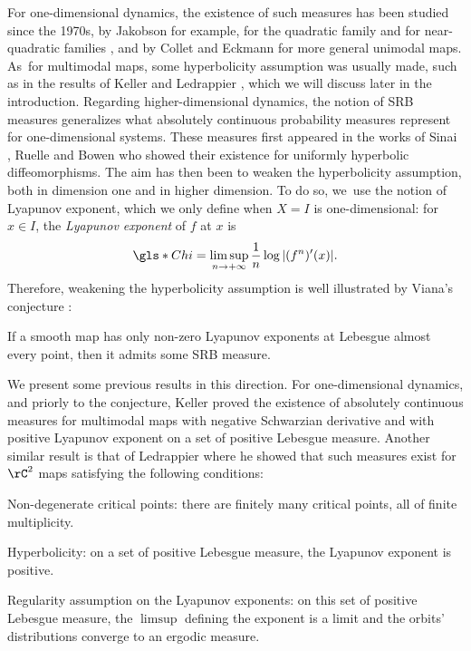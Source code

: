 For one-dimensional dynamics, the existence of such measures has been studied since the 1970s,
by Jakobson for example, for the quadratic family \cite{Jakobson1980} and for near-quadratic families \cite{Jakobson1981}, and by Collet and Eckmann \cite{ColletEckmann} for more general unimodal maps. As~for multimodal maps, some hyperbolicity assumption was usually made, such as in the results of Keller \cite{Keller_1990} and Ledrappier \cite{Ledrappier_1981}, which we will discuss later in the introduction.
Regarding higher-dimensional dynamics, the notion of SRB measures generalizes what absolutely continuous probability measures represent for one-dimensional systems. These measures first appeared in the works of Sinai \cite{Sinai_1972}, Ruelle \cite{Ruelle_1978,Ruelle_1976} and Bowen \cite{Bowen_1975} who showed their existence for uniformly hyperbolic diffeomorphisms.
The aim has then been to weaken the hyperbolicity assumption, both in dimension one and in higher dimension.
To do so, we~use the notion of Lyapunov exponent, which we only define when $X=I$ is one-dimensional: for $x \in I$, the \textit{Lyapunov exponent} of $f$ at $x$ is
\[
\gls*{Chi} = \limsup_{n \to +\infty} \frac{1}{n} \log |(f^n)'(x)|.
\]
Therefore, weakening the hyperbolicity assumption is well illustrated by Viana's conjecture \cite{Viana1998DynamicsAP}:

\begin{conj*}
If a smooth map has only non-zero Lyapunov exponents at Lebesgue almost every point, then it admits some SRB measure.
\end{conj*}

We present some previous results in this direction. For one-dimensional dynamics, and priorly to the conjecture, Keller \cite{Keller_1990} proved the existence of absolutely continuous measures for multimodal maps with negative Schwarzian derivative and with positive Lyapunov exponent on a set of positive Lebesgue measure.
Another similar result is that of Ledrappier \cite{Ledrappier_1981} where he showed that such measures exist for $\rC^2$ maps satisfying the following conditions:
\begin{enumeratei}
\item
Non-degenerate critical points: there are finitely many critical points, all of finite multiplicity.
\item
Hyperbolicity: on a set of positive Lebesgue measure, the Lyapunov exponent is positive.
\item
Regularity assumption on the Lyapunov exponents: on this set of positive Lebesgue measure, the $\limsup$ defining the exponent is a limit and the orbits' distributions converge to an ergodic measure.
\end{enumeratei}

